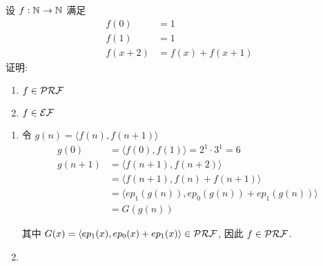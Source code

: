 \begin{problem}
设 $f : \mathbb{N}^{} \to \mathbb{N}^{}$ 满足
\begin{align*}
f(0) & = 1 \\
f(1) & = 1 \\
f(x + 2) & = f(x) + f(x + 1)
\end{align*}
证明:

\begin{enumerate}
    \item $f \in \mathcal{PRF}$
    \item $f \in \mathcal{EF}$
\end{enumerate}
\end{problem}

\begin{solution}
\begin{enumerate}
\item 
令 $g(n) = \langle f(n), f(n + 1) \rangle$
\begin{align*}
g(0) & = \langle f(0), f(1) \rangle = 2^1 \cdot 3^1 = 6 \\
g(n + 1) & = \langle f(n + 1), f(n + 2) \rangle \\
& = \langle f(n + 1), f(n) + f(n + 1) \rangle \\
& = \langle ep_1(g(n)), ep_0(g(n)) + ep_1(g(n)) \rangle \\
& = G(g(n))
\end{align*}

其中 $G(x) = \langle ep_1(x), ep_0(x) + ep_1(x) \rangle \in \mathcal{PRF}$, 因此 $f \in \mathcal{PRF}$.

\item



\end{enumerate}
\end{solution}

